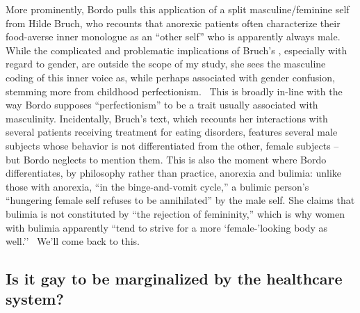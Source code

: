 \documentclass[11pt]{article}
\begin{document}
    More prominently, Bordo pulls this application of a split masculine/feminine self from Hilde Bruch, who recounts that anorexic patients often characterize their food-averse inner monologue as an ``other self'' who is apparently always male.~\autocite[155]{Bordo03} While the complicated and problematic implications of Bruch's , especially with regard to gender, are outside the scope of my study, she sees the masculine coding of this inner voice as, while perhaps associated with gender confusion, stemming more from childhood perfectionism.~\autocite[55]{Bruch01} This is broadly in-line with the way Bordo supposes ``perfectionism'' to be a trait usually associated with masculinity. Incidentally, Bruch's text, which recounts her interactions with several patients receiving treatment for eating disorders, features several male subjects whose behavior is not differentiated from the other, female subjects -- but Bordo neglects to mention them. This is also the moment where Bordo differentiates, by philosophy rather than practice, anorexia and bulimia: unlike those with anorexia, ``in the binge-and-vomit cycle,'' a bulimic person's ``hungering female self refuses to be annihilated'' by the male self. She claims that bulimia is not constituted by ``the rejection of femininity,'' which is why women with bulimia apparently ``tend to strive for a more `female-'looking body as well.''~\autocite[324][(what the fuck?)]{Bordo03} We'll come back to this.

    \subsection*{Is it gay to be marginalized by the healthcare system?}
\end{document}
